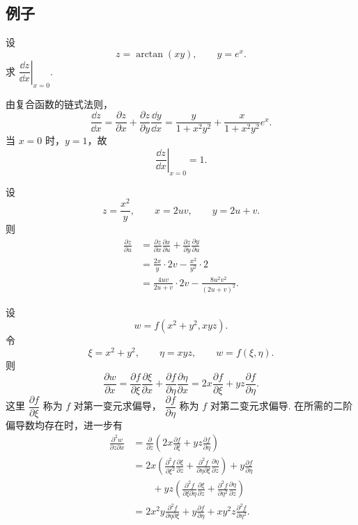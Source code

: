 \subsection*{例子}

\begin{example}
	设
	\[
	z=\arctan(xy),\qquad y=e^x.
	\]
	求 $\left.\dfrac{\dd z}{\dd x}\right|_{x=0}$.

	由复合函数的链式法则，
	\[
	\frac{\dd z}{\dd x}
	=
	\frac{\partial z}{\partial x}
	+
	\frac{\partial z}{\partial y}\frac{\dd y}{\dd x}
	=
	\frac{y}{1+x^2y^2}
	+
	\frac{x}{1+x^2y^2}e^x.
	\]
	当 $x=0$ 时，$y=1$，故
	\[
	\left.\frac{\dd z}{\dd x}\right|_{x=0}=1.
	\]
\end{example}

\begin{example}
	设
	\[
	z=\frac{x^2}{y},\qquad x=2uv,\qquad y=2u+v.
	\]
	则
	\[
	\begin{aligned}
	\frac{\partial z}{\partial u}
	&=
	\frac{\partial z}{\partial x}\frac{\partial x}{\partial u}
	+
	\frac{\partial z}{\partial y}\frac{\partial y}{\partial u}\\
	&=
	\frac{2x}{y}\cdot 2v-\frac{x^2}{y^2}\cdot 2\\
	&=
	\frac{4uv}{2u+v}\cdot 2v
	-
	\frac{8u^2v^2}{(2u+v)^2}.
	\end{aligned}
	\]
\end{example}

\begin{example}
	设
	\[
	w=f(x^2+y^2,xyz).
	\]
	令
	\[
	\xi=x^2+y^2,
	\qquad
	\eta=xyz,
	\qquad
	w=f(\xi,\eta).
	\]
	则
	\[
	\frac{\partial w}{\partial x}
	=
	\frac{\partial f}{\partial\xi}\frac{\partial\xi}{\partial x}
	+
	\frac{\partial f}{\partial\eta}\frac{\partial\eta}{\partial x}
	=
	2x\frac{\partial f}{\partial\xi}
	+yz\frac{\partial f}{\partial\eta}.
	\]
	这里 $\dfrac{\partial f}{\partial\xi}$ 称为 $f$ 对第一变元求偏导，
	$\dfrac{\partial f}{\partial\eta}$ 称为 $f$ 对第二变元求偏导.
	在所需的二阶偏导数均存在时，进一步有
	\[
	\begin{aligned}
	\frac{\partial^2w}{\partial z\partial x}
	&=
	\frac{\partial}{\partial z}
	\left(
	2x\frac{\partial f}{\partial\xi}
	+yz\frac{\partial f}{\partial\eta}
	\right)\\
	&=
	2x\left(
	\frac{\partial^2f}{\partial\xi^2}\frac{\partial\xi}{\partial z}
	+
	\frac{\partial^2f}{\partial\eta\partial\xi}
	\frac{\partial\eta}{\partial z}
	\right)
	+y\frac{\partial f}{\partial\eta}\\
	&\qquad
	+yz\left(
	\frac{\partial^2f}{\partial\xi\partial\eta}
	\frac{\partial\xi}{\partial z}
	+
	\frac{\partial^2f}{\partial\eta^2}
	\frac{\partial\eta}{\partial z}
	\right)\\
	&=
	2x^2y\frac{\partial^2f}{\partial\eta\partial\xi}
	+y\frac{\partial f}{\partial\eta}
	+xy^2z\frac{\partial^2f}{\partial\eta^2}.
	\end{aligned}
	\]
\end{example}

